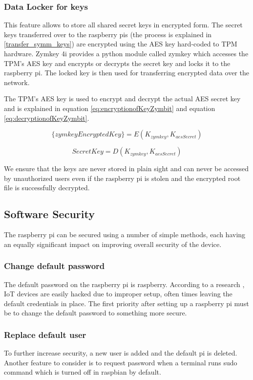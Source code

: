 \documentclass[11pt,openright]{report}
\begin{document}
\subsubsection{Data Locker for keys}
This feature allows to store all shared secret keys in encrypted form. The secret keys transferred over to the raspberry pis (the process is explained in \ref{transfer_symm_keys}) are encrypted using the AES key hard-coded to TPM hardware. Zymkey 4i provides a python module called zymkey which accesses the TPM's AES key and encrypts or decrypts the secret key and locks it to the raspberry pi. The locked key is then used for transferring encrypted data over the network.

The TPM's AES key is used to encrypt and decrypt the actual AES secret key and is explained in equation \ref{eq:encryptionofKeyZymbit} and equation \ref{eq:decryptionofKeyZymbit}.

\begin{equation} \label{eq:encryptionofKeyZymbit}
    \{zymkeyEncryptedKey\} =  E(K_{zymkey}, K_{aesSecret})
\end{equation}

\begin{equation} \label{eq:decryptionofKeyZymbit}
    SecretKey =  D(K_{zymkey}, K_{aesSecret})
\end{equation}

We ensure that the keys are never stored in plain sight and can never be accessed by unauthorized users even if the raspberry pi is stolen and the encrypted root file is successfully decrypted.

\subsection{Software Security}
The raspberry pi can be secured using a number of simple methods, each having an equally significant impact on improving overall security of the device.

\subsubsection{Change default password}
The default password on the raspberry pi is raspberry. According to a research \cite{8364059}, IoT devices are easily hacked due to improper setup, often times leaving the default credentials in place. The first priority after setting up a raspberry pi must be to change the default password to something more secure.

\subsubsection{Replace default user}
To further increase security, a new user is added and the default pi is deleted. Another feature to consider is to request password when a terminal runs sudo command which is turned off in raspbian by default.
\end{document}
